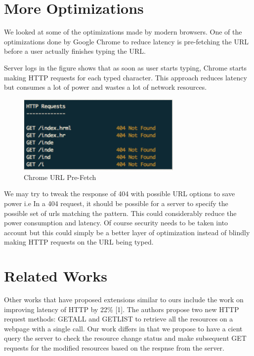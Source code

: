 \documentclass[9pt]{sigplan-proc-varsize}
\begin{document}
\bigskip

\section{More Optimizations}

We looked at some of the optimizations made by modern browsers. One of the optimizations done by Google Chrome to reduce latency is pre-fetching the URL before a user actually finishes typing the URL.
 
Server logs in the figure shows that  as  soon as user starts typing, Chrome starts making HTTP requests for each typed character. This approach reduces latency but consumes a lot of power and wastes a lot of network resources. 

\begin{figure}[ht!]
\centering
\includegraphics[width=80mm]{chrome}
\caption{Chrome URL Pre-Fetch}
\label{fig:sp_gd_mnist}
\end{figure}

We may try to tweak the response of 404 with possible URL options to save power i.e In a 404 request, it should be possible for a server to specify the possible set of urls matching the pattern. This could considerably reduce the power consumption and latency. Of course security needs to be taken into account but this could simply be a better layer of optimization instead of blindly making HTTP requests on the URL being typed. 

\bigskip

\section{ Related Works}

Other works that have proposed extensions similar to ours include the work on improving latency of HTTP by 22\% [1]. The authors propose two new HTTP request methods: GETALL and GETLIST to retrieve all the resources on a webpage with a single call. Our work differs in that we propose to have a cient query the server to check the resource change status and make subsequent GET requests for the modified resources based on the respnse from the server.
\end{document}
